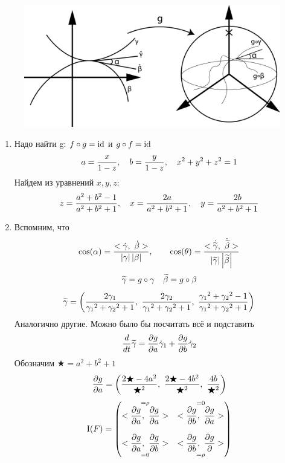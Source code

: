 \documentclass[main]{subfiles}
\begin{document}
    \begin{sol} \
      \begin{figure}[H]
          \includegraphics[scale=0.18]{pics/7_1}
          \centering
      \end{figure}
      \begin{enumerate}
        \item Надо найти g: $f \circ g = \mathop{\rm id}\nolimits$ и $g \circ f = \mathop{\rm id}\nolimits$
        \[a = \dfrac{x}{1-z},\quad b = \dfrac{y}{1-z},\quad x^2 + y^2 + z^2 = 1\]
        Найдем из уравнений $x,y,z$:
        \[z = \dfrac{a^2 + b^2 - 1}{a^2 + b^2 + 1},\quad
        x = \dfrac{2a}{a^2 + b^2 + 1},\quad
        y=\dfrac{2b}{a^2 + b^2 + 1}\]
        \item Вспомним, что
        \[\cos (\alpha) = \dfrac{<\dot{\gamma},\ \dot{\beta}>}{\abs{\gamma} \abs{\beta}},\qq
        \cos (\theta) = \dfrac{<\dot{\w{\gamma}},\ \dot{\w{\beta}}>}{\abs{\w{\gamma}} \abs{\w{\beta}}}\]
        \[\widetilde{\gamma} = g \circ \gamma\quad \widetilde{\beta} = g \circ \beta\]
        \[\widetilde{\gamma} = \left(
          \dfrac{2 \gamma_1}{{\gamma_1}^2 + {\gamma_2}^2 + 1},\
          \dfrac{2 \gamma_2}{{\gamma_1}^2 + {\gamma_2}^2 + 1},\
          \dfrac{{\gamma_1}^2 + {\gamma_2}^2 - 1}{{\gamma_1}^2 + {\gamma_2}^2 + 1}
        \right)\]
        Аналогично другие. Можно было бы посчитать всё и подставить
        \[\dfrac{d}{dt} \widetilde{\gamma} = \dfrac{\partial g}{\partial a} \dot{\gamma}_1 + \dfrac{\partial g}{\partial b} \dot{\gamma}_2\]
        Обозначим $\bigstar = a^2 + b^2 + 1$
        \[\dfrac{\partial g}{\partial a} = \left(
          \dfrac{2\bigstar-4a^2}{\bigstar^2},\
          \dfrac{2\bigstar-4b^2}{\bigstar^2},\
          \dfrac{4b}{\bigstar^2}
        \right)\]
        \[\RNumb{1}(F) = \begin{pmatrix}
          \os{=\rho}{<\dfrac{\d g}{\d a},\ \dfrac{\d g}{\d a}>} & \os{=0}{<\dfrac{\d g}{\d b},\ \dfrac{\d g}{\d a}>}\\ \\
          \us{=0}{<\dfrac{\d g}{\d a},\ \dfrac{\d g}{\d b}>} & \us{=\rho}{<\dfrac{\d g}{\d b},\ \dfrac{\d g}{\d \mathbf{}}>}

\end{pmatrix}\]
\end{enumerate}
\end{sol}
\end{document}
